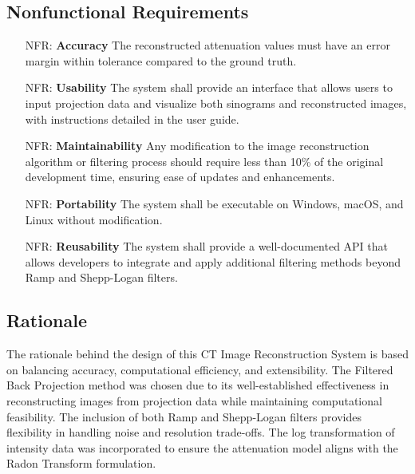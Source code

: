 \documentclass[12pt]{article}
\newcounter{nfrnum} %
\begin{document}
\subsection{Nonfunctional Requirements}
\noindent \begin{itemize}

\item[NFR\refstepcounter{nfrnum}\thenfrnum \label{NFR_Accuracy}:]
  \textbf{Accuracy} The reconstructed attenuation values must have an error margin
  within tolerance compared to the ground truth.

\item[NFR\refstepcounter{nfrnum}\thenfrnum \label{NFR_Usability}:] \textbf{Usability} The
  system shall provide an interface that allows users to input projection data
  and visualize both sinograms and reconstructed images, with instructions
  detailed in the user guide.

\item[NFR\refstepcounter{nfrnum}\thenfrnum \label{NFR_Maintainability}:]
  \textbf{Maintainability} Any modification to the image reconstruction
  algorithm or filtering process should require less than 10\% of the original
  development time, ensuring ease of updates and enhancements.

\item[NFR\refstepcounter{nfrnum}\thenfrnum \label{NFR_Portability}:]
  \textbf{Portability} The system shall be executable on Windows, macOS, and
  Linux without modification.

\item[NFR\refstepcounter{nfrnum}\thenfrnum \label{NFR_Reusability}:]
  \textbf{Reusability} The system shall provide a well-documented API that allows
  developers to integrate and apply additional filtering methods beyond Ramp and
  Shepp-Logan filters.
\end{itemize}

\subsection{Rationale}
The rationale behind the design of this CT Image Reconstruction System is based
on balancing accuracy, computational efficiency, and extensibility. The Filtered
Back Projection method was chosen due to its well-established
effectiveness in reconstructing images from projection data while maintaining
computational feasibility. The inclusion of both Ramp and Shepp-Logan filters
provides flexibility in handling noise and resolution trade-offs. The log
transformation of intensity data was incorporated to ensure the attenuation
model aligns with the Radon Transform formulation.\\
\end{document}
